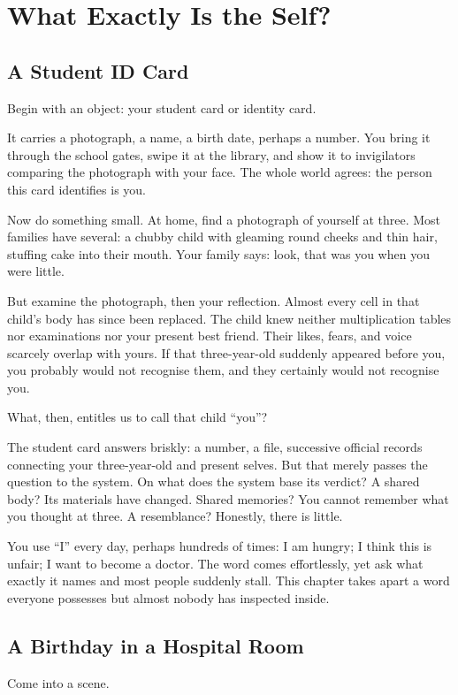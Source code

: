 \chapter{What Exactly Is the Self?}
\section{A Student ID Card}
Begin with an object: your student card or identity card.

It carries a photograph, a name, a birth date, perhaps a number. You bring it through the school gates, swipe it at the library, and show it to invigilators comparing the photograph with your face. The whole world agrees: the person this card identifies is you.

Now do something small. At home, find a photograph of yourself at three. Most families have several: a chubby child with gleaming round cheeks and thin hair, stuffing cake into their mouth. Your family says: look, that was you when you were little.

But examine the photograph, then your reflection. Almost every cell in that child's body has since been replaced. The child knew neither multiplication tables nor examinations nor your present best friend. Their likes, fears, and voice scarcely overlap with yours. If that three-year-old suddenly appeared before you, you probably would not recognise them, and they certainly would not recognise you.

What, then, entitles us to call that child ``you''?

The student card answers briskly: a number, a file, successive official records connecting your three-year-old and present selves. But that merely passes the question to the system. On what does the system base its verdict? A shared body? Its materials have changed. Shared memories? You cannot remember what you thought at three. A resemblance? Honestly, there is little.

You use ``I'' every day, perhaps hundreds of times: I am hungry; I think this is unfair; I want to become a doctor. The word comes effortlessly, yet ask what exactly it names and most people suddenly stall. This chapter takes apart a word everyone possesses but almost nobody has inspected inside.

\section{A Birthday in a Hospital Room}
Come into a scene.


